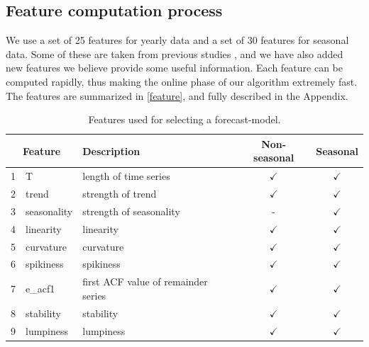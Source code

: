 \documentclass[11pt,a4paper,]{article}
\def\yes{$\checkmark$}
\theoremstyle{definition}
\theoremstyle{definition}
\theoremstyle{definition}
\theoremstyle{remark}
\begin{document}
\hypertarget{sec:features}{%
\subsection{Feature computation process}\label{sec:features}}

We use a set of 25 features for yearly data and a set of 30 features for
seasonal data. Some of these are taken from previous studies
\autocites{wang2009rule}{hyndman2015large}{kang2017visualising}, and we
have also added new features we believe provide some useful information.
Each feature can be computed rapidly, thus making the online phase of
our algorithm extremely fast. The features are summarized in
\autoref{feature}, and fully described in the Appendix.

\begin{table}[!htp]
\centering\footnotesize\tabcolsep=0.12cm
\caption{Features used for selecting a forecast-model.}
\label{feature}
\begin{tabular}{llp{}cc}
\toprule
\multicolumn{2}{c}{Feature} & Description & Non-seasonal & Seasonal\\ 
\midrule
1  & T              & length of time series                                                                   & \yes  & \yes \\
2  & trend          & strength of trend                                                                       & \yes  & \yes\\
3  & seasonality       & strength of seasonality                                                                 & -     & \yes \\
4  & linearity      & linearity                                                                               & \yes  & \yes \\
5  & curvature      & curvature                                                                               & \yes  & \yes \\
6  & spikiness      & spikiness                                                                               & \yes  & \yes \\
7  & e\_acf1        & first ACF value of remainder series                                                     & \yes  & \yes \\
8  & stability      & stability                                                                               & \yes  & \yes \\
9  & lumpiness      & lumpiness                                                                               & \yes  & \yes \\

\end{tabular}
\end{table}
\end{document}
